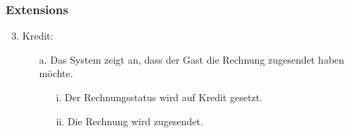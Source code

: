 \documentclass[./detailed_overview_usecases.tex]{subfiles}
\begin{document}
    \subsubsection*{Extensions}
    \begin{enumerate}
        \setcounter{enumi}{2}
        \item Kredit:
            \begin{itemize}
            \item[a.] Das System zeigt an, dass der Gast die Rechnung zugesendet haben möchte.
            \begin{itemize}
                \item[i.] Der Rechnungsstatus wird auf Kredit gesetzt.
                \item[ii.] Die Rechnung wird zugesendet.
            \end{itemize}
        \end{itemize}
    \end{enumerate}
\end{document}
